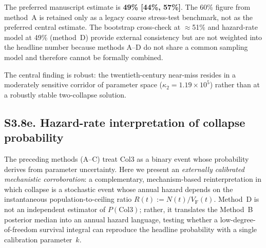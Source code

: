 \documentclass[11pt]{article}
\newcommand{\VF}{V_{\mathrm{F}}}
\begin{document}
The preferred manuscript estimate is \textbf{49\% [44\%, 57\%]}. The 60\% figure from method~A is retained only as a legacy coarse stress-test benchmark, not as the preferred central estimate. The bootstrap cross-check at $\approx$51\% and hazard-rate model at 49\% (method~D) provide external consistency but are not weighted into the headline number because methods A--D do not share a common sampling model and therefore cannot be formally combined.

The central finding is robust: the twentieth-century near-miss resides in a moderately sensitive corridor of parameter space ($\kappa_2=1.19\times 10^5$) rather than at a robustly stable two-collapse solution.

\subsection*{S3.8e. Hazard-rate interpretation of collapse probability}

The preceding methods (A--C) treat Col3 as a binary event whose probability
derives from parameter uncertainty.  Here we present an \emph{externally
calibrated mechanistic corroboration}: a complementary, mechanism-based
reinterpretation in which collapse is a stochastic event
whose annual hazard depends on the instantaneous population-to-ceiling ratio
$R(t) := N(t)/\VF(t)$.  Method~D is not an independent estimator of
$P(\mathrm{Col3})$; rather, it translates the Method~B posterior median
into an annual hazard language, testing whether a low-degree-of-freedom
survival integral can reproduce the headline probability with a single
calibration parameter~$k$.
\end{document}
